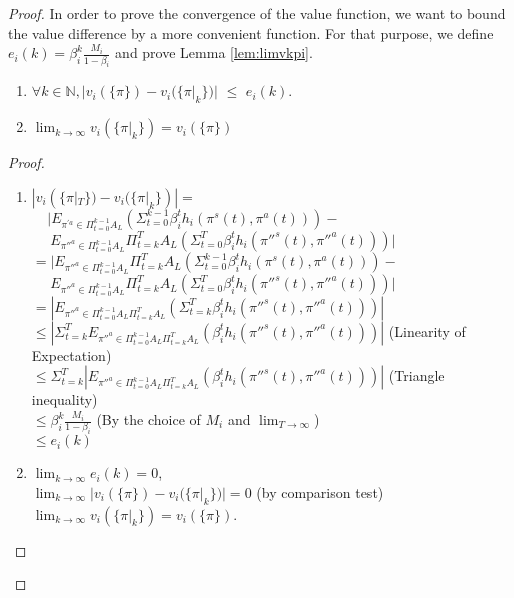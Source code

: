 \begin{proof}
In order to prove the convergence of the value function, we want to bound the value difference by a more convenient function. For that purpose, we define $e_i(k)=\beta_i^{k}\frac{M_i}{1-\beta_i}$ and prove Lemma \ref{lem:limvkpi}.
\setcounter{lemma}{0}
\begin{lemma}\label{lem:limvkpi}
	\begin{enumerate}
		\item $\forall k\in \mathbb{N}, |v_i(\{\pi\})-v_i(\{\pi|_k\})|$ $\le$ $e_i(k)$.	
		\item $\lim_{k\to\infty}  v_i(\{\pi|_k\})=v_i(\{\pi\})$
	\end{enumerate}
\end{lemma}

\begin{proof}
	\begin{enumerate}
		\item 	$|v_i(\{\pi|_T\})-v_i(\{\pi|_k\})| =$\\
		$~~~~~| E_{\pi^{'a} \in \Pi_{t=0}^{k-1} A_{L}}(\Sigma_{t=0}^{k-1} \beta_i^{t}h_{i}(\pi^{s}(t),\pi^{a}(t))) -$\\
		$~~~~~~ E_{\pi''^{a} \in \Pi_{t=0}^{k-1} A_{L}} \Pi_{t=k}^{T} A_{L}(\Sigma_{t=0}^{T} \beta_i^{t}h_{i}(\pi''^{s}(t),\pi''^{a}(t)))|$\\
		$=| E_{\pi''^{a} \in \Pi_{t=0}^{k-1} A_{L}} \Pi_{t=k}^{T} A_{L}(\Sigma_{t=0}^{k-1} \beta_i^{t}h_{i}(\pi^{s}(t),\pi^{a}(t)))-$\\
		$~~~~~~ E_{\pi''^{a} \in \Pi_{t=0}^{k-1} A_{L}} \Pi_{t=k}^{T} A_{L}(\Sigma_{t=0}^{T} \beta_i^{t}h_{i}(\pi''^{s}(t),\pi''^{a}(t)))|$\\
		$ =|E_{\pi''^{a} \in \Pi_{t=0}^{k-1} A_{L} \Pi_{t=k}^{T} A_{L}}(\Sigma_{t=k}^{T} \beta_i^{t}h_{i}(\pi''^{s}(t),\pi''^{a}(t)))|$\\
		$\leq |\Sigma_{t=k}^{T} E_{\pi''^{a} \in \Pi_{t=0}^{k-1} A_{L} \Pi_{t=k}^{T} A_{L}}( \beta_i^{t}h_{i}(\pi''^{s}(t),\pi''^{a}(t)))| $ (Linearity of Expectation)\\
		$\leq \Sigma_{t=k}^{T}| E_{\pi''^{a} \in \Pi_{t=0}^{k-1} A_{L} \Pi_{t=k}^{T} A_{L}}( \beta_i^{t}h_{i}(\pi''^{s}(t),\pi''^{a}(t)))| $ (Triangle inequality)\\
		$\le \beta_i^{k}\frac{M_i}{1-\beta_i}$ (By the choice of $M_i$ and $\lim_{T\to\infty}$)\\
		$\leq e_i(k)$
		\item $\lim_{k\to\infty} e_i(k)=0$,\\
		$\lim_{k\to\infty} |v_i(\{\pi\})-v_i(\{\pi|_k\})| = 0$ (by comparison test)\\
		$\lim_{k\to\infty} v_i(\{\pi|_k\})=v_i(\{\pi\})$.
	\end{enumerate}
\end{proof}



\end{proof}
